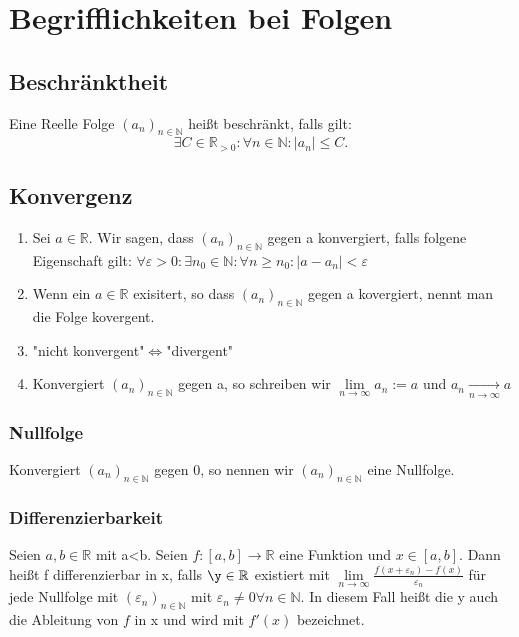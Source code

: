 \documentclass[11pt]{article}
\begin{document}
    \section{Begrifflichkeiten bei Folgen}
    \subsection{Beschränktheit}
    Eine Reelle Folge $(a_n)_{n\in \mathbb{N}}$ heißt beschränkt, falls gilt:
    \[
        \exists C \in \mathbb{R}_{>0}:\forall n \in \mathbb{N}:|a_n|\leq C.
    \]
    \subsection{Konvergenz}
    \begin{enumerate}[label=(\alph*)]
        \item Sei $a\in \mathbb{R}$. Wir sagen, dass $(a_n)_{n\in\mathbb{N}}$ gegen a konvergiert, falls folgene Eigenschaft gilt: \newline
        \hspace*{10mm}$\forall\varepsilon>0:\exists n_0\in \mathbb{N}:\forall n \geq n_0:|a-a_n|<\varepsilon$
        \item Wenn ein $a\in\mathbb{R}$ exisitert, so dass $(a_n)_{n\in\mathbb{N}}$ gegen a kovergiert, nennt man die Folge kovergent.
        \item "nicht konvergent"$\Leftrightarrow$"divergent"
        \item Konvergiert $(a_n)_{n\in\mathbb{N}}$ gegen a, so schreiben wir \newline
        \hspace*{10mm} $\lim \limits_{n \to \infty}a_n:=a$ und $a_n\xrightarrow[n \rightarrow \infty]\: a$
    \end{enumerate}
    \subsubsection{Nullfolge}
    Konvergiert $(a_n)_{n\in\mathbb{N}}$ gegen 0, so nennen wir $(a_n)_{n\in\mathbb{N}}$ eine Nullfolge.
    \subsubsection{Differenzierbarkeit}
    Seien $a,b\in\mathbb{R}$ mit a<b. Seien $f:[a,b]\rightarrow\mathbb{R}$ eine Funktion und $x\in[a,b]$. \newline
    Dann heißt f differenzierbar in x, falls $\y\in\mathbb{R}$ existiert mit \newline\newline
    \hspace*{10mm} $\lim \limits_{n \to \infty}\frac{f(x+\varepsilon_n)-f(x)}{\varepsilon_n}$ \newline\newline
    für jede Nullfolge mit $(\varepsilon_n)_{n\in\mathbb{N}}$ mit $\varepsilon_n\neq 0 \forall n\in\mathbb{N}$. In diesem Fall
    heißt die y auch die Ableitung von $f$ in x und wird mit $f'(x)$ bezeichnet.
\end{document}
